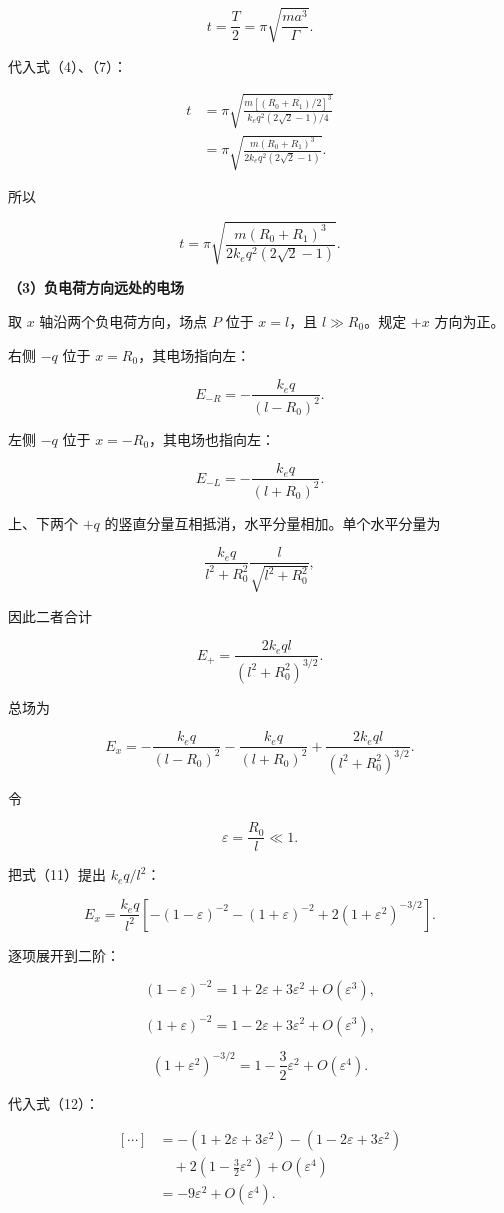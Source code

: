 \documentclass[12pt,a4paper,UTF8]{ctexart}
\begin{document}
\[
t=\frac T2
=\pi\sqrt{\frac{ma^3}{\Gamma}}.
\tag{9}
\]

代入式（4）、（7）：

\[
\begin{aligned}
t
&=\pi
\sqrt{
\frac{m[(R_0+R_1)/2]^3}
{k_eq^2(2\sqrt2-1)/4}
}\\
&=\pi
\sqrt{
\frac{m(R_0+R_1)^3}
{2k_eq^2(2\sqrt2-1)}
}.
\end{aligned}
\]

所以

\[
\boxed{
t=\pi\sqrt{
\frac{m(R_0+R_1)^3}
{2k_eq^2(2\sqrt2-1)}
}
}.
\tag{10}
\]

\textbf{（3）负电荷方向远处的电场}

取 \(x\) 轴沿两个负电荷方向，场点 \(P\) 位于 \(x=l\)，且
\(l\gg R_0\)。规定 \(+x\) 方向为正。

右侧 \(-q\) 位于 \(x=R_0\)，其电场指向左：

\[
E_{-R}=-\frac{k_eq}{(l-R_0)^2}.
\]

左侧 \(-q\) 位于 \(x=-R_0\)，其电场也指向左：

\[
E_{-L}=-\frac{k_eq}{(l+R_0)^2}.
\]

上、下两个 \(+q\) 的竖直分量互相抵消，水平分量相加。单个水平分量为

\[
\frac{k_eq}{l^2+R_0^2}
\frac{l}{\sqrt{l^2+R_0^2}},
\]

因此二者合计

\[
E_+=\frac{2k_eql}{(l^2+R_0^2)^{3/2}}.
\]

总场为

\[
E_x
=-\frac{k_eq}{(l-R_0)^2}
-\frac{k_eq}{(l+R_0)^2}
+\frac{2k_eql}{(l^2+R_0^2)^{3/2}}.
\tag{11}
\]

令

\[
\varepsilon=\frac{R_0}{l}\ll1.
\]

把式（11）提出 \(k_eq/l^2\)：

\[
E_x=\frac{k_eq}{l^2}
\left[
-(1-\varepsilon)^{-2}
-(1+\varepsilon)^{-2}
+2(1+\varepsilon^2)^{-3/2}
\right].
\tag{12}
\]

逐项展开到二阶：

\[
(1-\varepsilon)^{-2}
=1+2\varepsilon+3\varepsilon^2+O(\varepsilon^3),
\]

\[
(1+\varepsilon)^{-2}
=1-2\varepsilon+3\varepsilon^2+O(\varepsilon^3),
\]

\[
(1+\varepsilon^2)^{-3/2}
=1-\frac32\varepsilon^2+O(\varepsilon^4).
\]

代入式（12）：

\[
\begin{aligned}
[\cdots]
&=-(1+2\varepsilon+3\varepsilon^2)
-(1-2\varepsilon+3\varepsilon^2)\\
&\quad+2\left(1-\frac32\varepsilon^2\right)
+O(\varepsilon^4)\\
&=-9\varepsilon^2+O(\varepsilon^4).
\end{aligned}
\]
\end{document}
